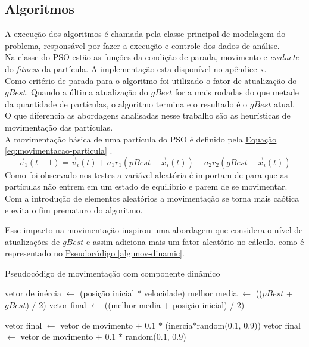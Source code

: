 \subsection{Algoritmos}
A execução dos algoritmos é chamada pela classe principal de modelagem do problema, responsável por fazer a execução e controle dos dados de análise.\\
%
Na classe do PSO estão as funções da condição de parada, movimento e \textit{evaluete} do \textit{fitness} da partícula. A implementação esta disponível no apêndice x.\\ %
%
%
Como critério de parada para o algoritmo foi utilizado o fator de atualização do $gBest$. Quando a última atualização do $gBest$ for a mais rodadas do que metade da quantidade de partículas, o algoritmo termina e o resultado é o $gBest$ atual.\\
\indent O que diferencia as abordagens analisadas nesse trabalho são as heurísticas de movimentação das partículas.\\
A movimentação básica de uma partícula do PSO é definido pela
\hyperref[eq:movimentacao-particula]{Equação \ref{eq:movimentacao-particula}}
.
%
\begin{equation} 
    \label{eq:movimentacao-particula}
    \vec v_1(t+1)= \vec v_i(t) + a_1 r_1 (pBest - \vec x_i(t)) + a_2 r_2 (gBest - \vec x_i(t))
\end{equation}
%
Como foi observado nos testes a variável aleatória é importam de para que as partículas não entrem em um estado de equilíbrio e parem de se movimentar. Com a introdução de elementos aleatórios a movimentação se torna mais caótica e evita o fim prematuro do algoritmo.

Esse impacto na movimentação inspirou uma abordagem que considera o nível de atualizações de $gBest$ e assim adiciona mais um fator aleatório no cálculo. como é representado no 
\hyperref[alg:mov-dinamic]{Pseudocódigo \ref{alg:mov-dinamic}}.
\begin{algorithm}
    \caption{Pseudocódigo de movimentação com componente dinâmico}\label{alg:mov-dinamic}
\begin{algorithmic}

\State vetor de inércia $\gets$ (posição inicial * velocidade)
\State melhor media $\gets$ (($pBest$ + $gBest$) / 2)
\State vetor final $\gets$ ((melhor media + posição inicial) / 2)

    \State vetor final $\gets$ vetor de movimento $+$ $0.1$ $*$ (inercia$*$random($0.1$, $0.9$))
\Else
    \State vetor final $\gets$ vetor de movimento $+$ $0.1$ $*$ random($0.1$, $0.9$) 
\EndIf    
\end{algorithmic}
\end{algorithm}

